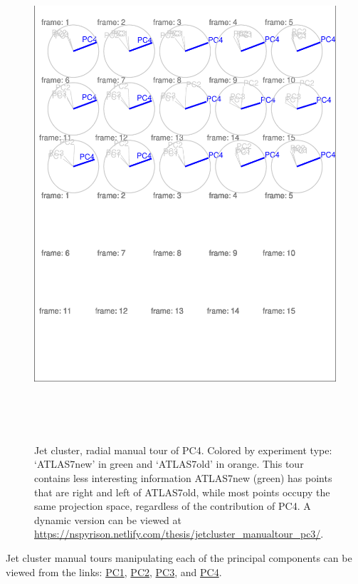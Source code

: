 \documentclass{monashthesis}
\begin{document}
\begin{figure}

{\centering \includegraphics[width=6in,height=7.2in]{thesis_files/figure-latex/JetClusterBad-1} 

}

\caption{Jet cluster, radial manual tour of PC4. Colored
by experiment type: `ATLAS7new' in green and `ATLAS7old' in orange. This
tour contains less interesting information ATLAS7new (green) has points
that are right and left of ATLAS7old, while most points occupy the same
projection space, regardless of the contribution of PC4. A dynamic
version can be viewed at
\url{https://nspyrison.netlify.com/thesis/jetcluster_manualtour_pc3/}.}\label{fig:JetClusterBad}
\end{figure}

Jet cluster manual tours manipulating each of the principal components
can be viewed from the links:
\href{https://nspyrison.netlify.com/thesis/jetcluster_manualtour_pc1/}{PC1},
\href{https://nspyrison.netlify.com/thesis/jetcluster_manualtour_pc2/}{PC2},
\href{https://nspyrison.netlify.com/thesis/jetcluster_manualtour_pc3/}{PC3},
and
\href{https://nspyrison.netlify.com/thesis/jetcluster_manualtour_pc4/}{PC4}.
\end{document}
